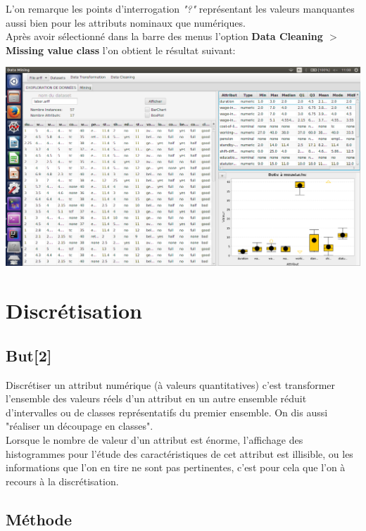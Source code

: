 \documentclass[12pt,a4paper,oneside]{book}
\begin{document}
	L'on remarque les points d'interrogation \textit{"?"} représentant les valeurs manquantes aussi bien pour les attributs nominaux que numériques.\\
	
	Après avoir sélectionné dans la barre des menus l'option \textbf{Data Cleaning $>$ Missing value class} l'on obtient le résultat suivant:
	
	\begin{center}
		\includegraphics[width=1\textwidth]{screens/apresMissing.png}%
		\label{labelname}%
	\end{center}
	
	\section{Discrétisation}
	\subsection{But[2]}
	Discrétiser un attribut numérique (à valeurs quantitatives) c'est transformer l'ensemble des valeurs réels d'un attribut en un autre ensemble réduit d'intervalles ou de classes représentatifs du premier ensemble. On dis aussi "réaliser un découpage en classes". \\
	Lorsque le nombre de valeur d'un attribut est énorme, l'affichage des histogrammes pour l'étude des caractéristiques de cet attribut est illisible, ou les informations que l'on en tire ne sont pas pertinentes, c'est pour cela que l'on à recours à la discrétisation.
	
	\subsection{Méthode}
\end{document}
